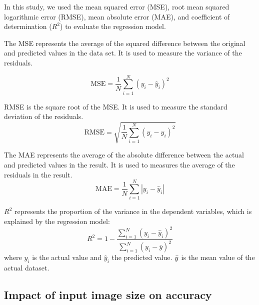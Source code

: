 \documentclass{proc-a4}
\begin{document}
 In this study, we used the mean squared error (MSE), root mean squared logarithmic error (RMSE), mean absolute error (MAE), and coefficient of determination ($R^2$) to evaluate the regression model.
 
The MSE  represents the average of the squared difference between the original and predicted values in the data set. It is used to measure the variance of the residuals.


\begin{equation}
\mathrm{MSE}=\frac{1}{N} \sum_{i=1}^N\left(y_i-\hat{y}_i\right)^2
\end{equation}

RMSE is the square root of the MSE. It is used to measure the standard deviation of the residuals.
\begin{equation}
\mathrm{RMSE}=\sqrt{\frac{1}{N} \sum_{i=1}^N\left(y_i-\hat{y}_i\right)^2}
\end{equation}

The MAE represents the average of the absolute difference between the actual and predicted values in the result. It is used to measures the average of the residuals in the result.
\begin{equation}
\mathrm{MAE}=\frac{1}{N} \sum_{i=1}^N\left|y_i-\hat{y}_i\right|
\end{equation}

$R^2$ represents the proportion of the variance in the dependent variables, which is explained by the regression model:
\begin{equation}
R^2=1-\frac{\sum_{i=1}^N\left(y_i-\hat{y}_i\right)^2}{\sum_{i=1}^N\left(y_i-\bar{y}\right)^2}
\end{equation}
where $y_i$ is the actual value and $\hat{y}_i$ the predicted value. $\Bar{y}$ is the mean value of the actual dataset.

\subsection{Impact of input image size on accuracy}
\end{document}
